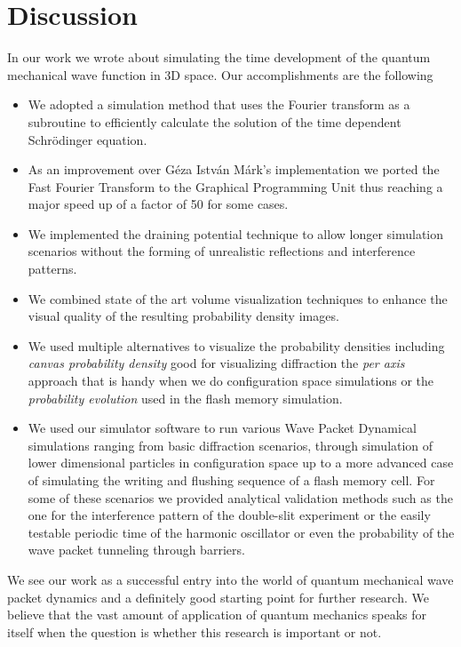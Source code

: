 \section{Discussion}
\label{sec:discussion}

In our work we wrote about simulating the time development of the quantum mechanical wave function in 3D space.
Our accomplishments are the following
\begin{itemize}
	\item We adopted a simulation method that uses the Fourier transform as a subroutine to efficiently calculate the solution of the time dependent Schrödinger equation.
	\item As an improvement over Géza István Márk's implementation we ported the Fast Fourier Transform to the Graphical Programming Unit thus reaching a major speed up of a factor of 50 for some cases.
	\item We implemented the draining potential technique to allow longer simulation scenarios without the forming of unrealistic reflections and interference patterns.
	\item We combined state of the art volume visualization techniques to enhance the visual quality of the resulting probability density images.
	\item We used multiple alternatives to visualize the probability densities including \textit{canvas probability density} good for visualizing diffraction the \textit{per axis} approach that is handy when we do configuration space simulations or the \textit{probability evolution} used in the flash memory simulation.
	\item We used our simulator software to run various Wave Packet Dynamical simulations ranging from basic diffraction scenarios, through simulation of lower dimensional particles in configuration space up to a more advanced case of simulating the writing and flushing sequence of a flash memory cell. For some of these scenarios we provided analytical validation methods such as the one for the interference pattern of the double-slit experiment or the easily testable periodic time of the harmonic oscillator or even the probability of the wave packet tunneling through barriers.
\end{itemize}
We see our work as a successful entry into the world of quantum mechanical wave packet dynamics and a definitely good starting point for further research.
We believe that the vast amount of application of quantum mechanics speaks for itself when the question is whether this research is important or not.
